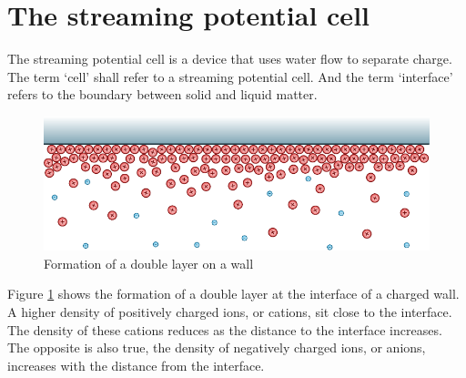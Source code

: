 
%
%
%



\section{The streaming potential cell}
\label{sect:streamingPotentialCell}

The streaming potential cell is a device that uses water flow to separate charge.
The term `cell' shall refer to a streaming potential cell.
And the term `interface' refers to the boundary between solid and liquid matter.

\begin{figure}
    \centering
    \includegraphics{content/pt1/01-PowerHarvesting/graphics/doubleLayerOnWall}
    \caption{\label{fig:doubleLayerOnWall}Formation of a double layer on a wall}
\end{figure}

Figure \ref{fig:doubleLayerOnWall} shows the formation of a double layer at the interface of a charged wall.
A higher density of positively charged ions, or cations, sit close to the interface.
The density of these cations reduces as the distance to the interface increases.
The opposite is also true, the density of negatively charged ions, or anions, increases with the distance from the interface.

